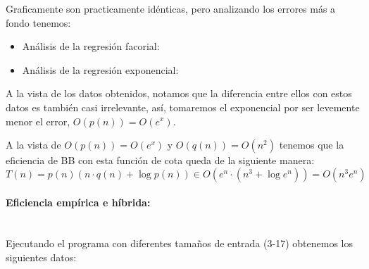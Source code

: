 \documentclass{article}
\newcommand{\myparagraph}[1]{\paragraph{#1}\mbox{}\\}
\begin{document}
Graficamente son practicamente idénticas, pero analizando los errores más a fondo tenemos:

\begin{itemize}
    \item Análisis de la regresión facorial: 
    
    \item Análisis de la regresión exponencial:
    
\end{itemize}

A la vista de los datos obtenidos, notamos que la diferencia entre ellos con estos datos es también casi irrelevante, así, tomaremos el exponencial por ser levemente menor el error, $O(p(n)) = O(e^x)$. 

A la vista de $O(p(n)) = O(e^x)$ y $O(q(n)) = O(n^2)$ tenemos que la eficiencia de BB con esta función de cota queda de la siguiente manera: 
\[
T(n) = p(n)(n\cdot q(n)+\log{p(n)}) \in O(e^n\cdot(n^3 + \log{e^n})) = O(n^3 e^n)
\]

\myparagraph{Eficiencia empírica e híbrida: }

Ejecutando el programa con diferentes tamaños de entrada (3-17) obtenemos los siguientes datos:
\end{document}
